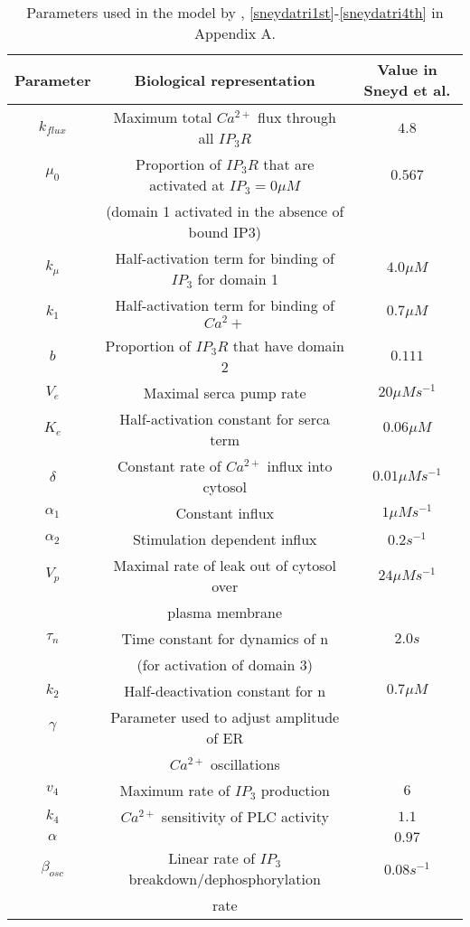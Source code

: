 \begin{table}[h!!!t!!!b!!!p]
\begin{center}
\begin{tabular}{ c c c }
 Parameter & Biological representation & Value in Sneyd et al.\\
 \hline
 $k_{flux}$ & Maximum total $Ca^{2+}$ flux through all $IP_3R$ & $4.8$\\
 \hline
 $\mu_0$ & Proportion of $IP_3R$ that are activated at $IP_3=0 \mu M$ & $0.567$\\
 &(domain 1 activated in the absence of bound IP3) &\\
 \hline
 $k_{\mu}$ & Half-activation term for binding of $IP_3$ for domain 1 & $4.0\mu M$ \\
 \hline
 $k_1$ & Half-activation term for binding of $Ca^2+$ & $0.7 \mu M$ \\
 \hline
 $b$ & Proportion of $IP_3R$ that have domain 2 & $0.111$ \\
 \hline
 $V_e$ & Maximal serca pump rate & $20 \mu Ms^{-1}$\\
 \hline
 $K_e$ & Half-activation constant for serca term & $0.06 \mu M $\\
 \hline
 $\delta$ & Constant rate of $Ca^{2+}$ influx into cytosol & $0.01 \mu Ms^{-1}$ \\
 \hline
 $\alpha_1$ & Constant influx & $1 \mu Ms^{-1}$\\
 \hline
 $\alpha_2$ & Stimulation dependent influx & $0.2 s^{-1}$\\
 \hline
 $V_p$ & Maximal rate of leak out of cytosol over & $24 \mu Ms^{-1}$ \\
 & plasma membrane &\\
 \hline
 $\tau_n$ & Time constant for dynamics of n & $2.0 s$\\
 & (for activation of domain 3) & \\
 \hline
 $k_2$ & Half-deactivation constant for n & $0.7 \mu M$\\
 \hline
 $\gamma$ & Parameter used to adjust amplitude of ER & \\
 & $Ca^{2+}$ oscillations & \\
 \hline
 $v_4$ & Maximum rate of $IP_3$ production & $6$ \\
 \hline
 $k_4$ & $Ca^{2+}$ sensitivity of PLC activity & $1.1$\\ 
 \hline
 $\alpha$ &  & $0.97$\\
 \hline
 $\beta_{osc}$ & Linear rate of $IP_3$ breakdown/dephosphorylation & $0.08 s^{-1}$\\
 &  rate &\\
\end{tabular}
\end{center}
\caption{Parameters used in the model by , \eqref{sneydatri1st}-\eqref{sneydatri4th} in Appendix A.}\label{sneydatritable}
\end{table}
